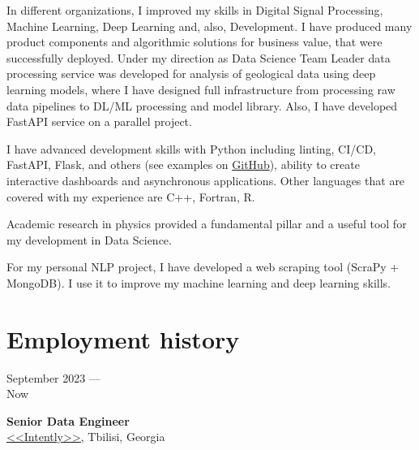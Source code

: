 \documentclass[10pt,a4paper]{article}
\newcommand{\lmpratio}{0.15}
\newcommand{\rmpratio}{0.74}
\newcommand{\verticalSpace}{0.3cm}
\newcommand{\vSpace}{0.5cm}
\newcommand{\horizontalSpace}{0.05\textwidth}
\newcommand{\sectionMain}[1]{\textbf{#1}}
\begin{document}
In different organizations, I improved my skills in Digital Signal Processing, Machine Learning, Deep Learning and, also, Development. I have produced many product components and algorithmic solutions for business value, that were successfully deployed.
Under my direction as Data Science Team Leader data processing service was developed for analysis of geological data using deep learning models, where I have designed full infrastructure from processing raw data pipelines to DL/ML processing and model library.
Also, I have developed FastAPI service on a parallel project. 


I have advanced development skills with Python including linting, CI/CD, FastAPI, Flask, and others (see examples on \href{https://github.com/ArseniyShchepetnov}{GitHub}), ability to create interactive dashboards and asynchronous applications.
Other languages that are covered with my experience are C++, Fortran, R.

Academic research in physics provided a fundamental pillar and a useful tool for my development in Data Science.

For my personal NLP project, I have developed a web scraping tool (ScraPy + MongoDB). I use it to improve my machine learning and deep learning skills.



\newpage


	\setlength{\parindent}{0em}
	\vspace{\verticalSpace}
	\section*{Employment history}

	\begin{minipage}[t]{\lmpratio\textwidth}
		September 2023 --- \\Now
	\end{minipage}
	\hspace{\horizontalSpace}
	\begin{minipage}[t]{\rmpratio\textwidth}
		\sectionMain{Senior Data Engineer}\\
		\href{https://getintently.ai/}{<<Intently>>}, Tbilisi, Georgia\\[0.1cm]	

        


	\end{minipage}	
	\vspace{\vSpace}
\end{document}
